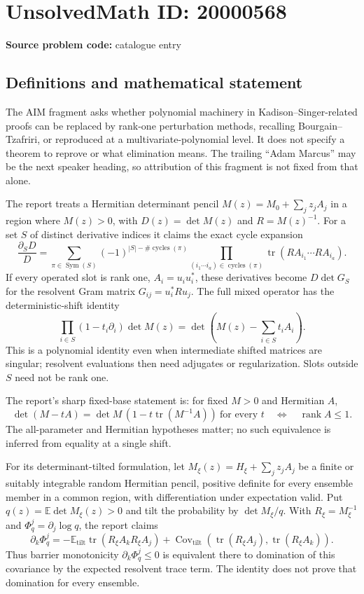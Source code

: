 \documentclass[11pt]{article}
\newcommand{\E}{\mathbb{E}}
\begin{document}
\section*{UnsolvedMath ID: 20000568}
\textbf{Source problem code:} catalogue entry
\subsection{Definitions and mathematical statement}
The AIM fragment asks whether polynomial machinery in Kadison--Singer-related proofs can be replaced by rank-one perturbation methods, recalling Bourgain--Tzafriri, or reproduced at a multivariate-polynomial level. It does not specify a theorem to reprove or what elimination means. The trailing ``Adam Marcus'' may be the next speaker heading, so attribution of this fragment is not fixed from that alone.

The report treats a Hermitian determinant pencil $M(z)=M_0+\sum_jz_jA_j$ in a region where $M(z)>0$, with $D(z)=\det M(z)$ and $R=M(z)^{-1}$. For a set $S$ of distinct derivative indices it claims the exact cycle expansion
\[
 \frac{\partial_S D}{D}=\sum_{\pi\in\operatorname{Sym}(S)}
 (-1)^{|S|-\#\operatorname{cycles}(\pi)}
 \prod_{(i_1\cdots i_a)\in\operatorname{cycles}(\pi)}
 \operatorname{tr}(RA_{i_1}\cdots RA_{i_a}).
\]
If every operated slot is rank one, $A_i=u_iu_i^*$, these derivatives become $D\det G_S$ for the resolvent Gram matrix $G_{ij}=u_i^*Ru_j$. The full mixed operator has the deterministic-shift identity
\[
 \prod_{i\in S}(1-t_i\partial_i)\det M(z)
 =\det\left(M(z)-\sum_{i\in S}t_iA_i\right).
\]
This is a polynomial identity even when intermediate shifted matrices are singular; resolvent evaluations then need adjugates or regularization. Slots outside $S$ need not be rank one.

The report's sharp fixed-base statement is: for fixed $M>0$ and Hermitian $A$,
\[
 \det(M-tA)=\det M\,(1-t\operatorname{tr}(M^{-1}A))\ \text{for every }t
 \quad\Longleftrightarrow\quad\operatorname{rank}A\leq1.
\]
The all-parameter and Hermitian hypotheses matter; no such equivalence is inferred from equality at a single shift.

For its determinant-tilted formulation, let $M_\xi(z)=H_\xi+\sum_jz_jA_j$ be a finite or suitably integrable random Hermitian pencil, positive definite for every ensemble member in a common region, with differentiation under expectation valid. Put $q(z)=\E\det M_\xi(z)>0$ and tilt the probability by $\det M_\xi/q$. With $R_\xi=M_\xi^{-1}$ and $\Phi_q^j=\partial_j\log q$, the report claims
\[
 \partial_k\Phi_q^j=-\E_{\mathrm{tilt}}\operatorname{tr}(R_\xi A_kR_\xi A_j)
 +\operatorname{Cov}_{\mathrm{tilt}}(\operatorname{tr}(R_\xi A_j),\operatorname{tr}(R_\xi A_k)).
\]
Thus barrier monotonicity $\partial_k\Phi_q^j\leq0$ is equivalent there to domination of this covariance by the expected resolvent trace term. The identity does not prove that domination for every ensemble.
\end{document}
